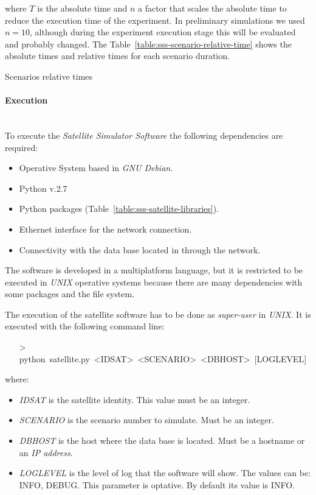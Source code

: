 where $T$ is the absolute time and $n$ a factor that scales the absolute time to
reduce the execution time of the experiment. In preliminary simulations we used
$n=10$, although during the experiment execution stage this will be evaluated
and probably changed. The Table~\ref{table:sss-scenario-relative-time} shows the absolute times and relative times for each scenario duration.


\begin{table}[h]
  \centering
  {\small
  
  }
  \caption{Scenarios relative times}
  \label{table:sss-scenario-relative-time}
\end{table}


\paragraph{Execution}~\\
\label{par:sat-simulator-execution}
To execute the \emph{Satellite Simulator Software} the following dependencies are
required:
\begin{itemize}
\item Operative System based in \emph{GNU Debian}.
\item Python v.2.7
\item Python packages (Table~\ref{table:sss-satellite-libraries}).
\item Ethernet interface for the network connection.
\item Connectivity with the data base located in \bonfire through the network.
\end{itemize}
The \satss software is developed in a multiplatform language, but it is restricted to be executed in \emph{UNIX} operative systems because there are many dependencies with some packages and the file system.

The execution of the satellite software has to be done as \emph{super-user} in
\emph{UNIX}. It is executed with the following command line:
\begin{itemize}
\item[>] python~satellite.py~<IDSAT>~<SCENARIO>~<DBHOST>~[LOGLEVEL]
\end{itemize}

where:
\begin{itemize}
\item \emph{IDSAT} is the satellite identity. This value must be an integer.
\item \emph{SCENARIO} is the scenario number to simulate. Must be an integer.
\item \emph{DBHOST} is the host where the data base is located. Must be a hostname or an \emph{IP address}.
\item \emph{LOGLEVEL} is the level of log that the software will show. The values can be: INFO, DEBUG. This parameter is optative. By default its value is INFO.
\end{itemize}

